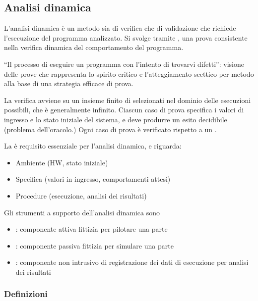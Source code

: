 \subsection{Analisi dinamica}
\label{sub:analisi_dinamica}

L'analisi dinamica è un metodo sia di verifica che di validazione che richiede
l'esecuzione del programma analizzato. Si svolge tramite , una
prova consistente nella verifica dinamica del comportamento del programma.

``Il processo di eseguire un programma con l'intento di trovarvi difetti'':
visione delle prove che rappresenta lo spirito critico e l'atteggiamento
scettico per metodo alla base di una strategia efficace di prova.

La verifica avviene su un insieme finito di  selezionati
nel dominio delle esecuzioni possibili, che è generalmente infinito. Ciascun
caso di prova specifica i valori di ingresso e lo stato iniziale del sistema, e
deve produrre un esito decidibile (problema dell'oracolo.) Ogni caso di prova è
verificato rispetto a un .

La  è requisito essenziale per l'analisi dinamica, e
riguarda:

\begin{itemize}
  \item Ambiente (HW, stato iniziale)
  \item Specifica (valori in ingresso, comportamenti attesi)
  \item Procedure (esecuzione, analisi dei risultati)
\end{itemize}

Gli strumenti a supporto dell'analisi dinamica sono

\begin{itemize}
  \item {}: componente attiva fittizia per pilotare una parte
  \item {}: componente passiva fittizia per simulare una parte
  \item {}: componente non intrusivo di registrazione dei dati di
    esecuzione per analisi dei risultati
\end{itemize}

\subsubsection{Definizioni}
\label{ssub:definizioni}

